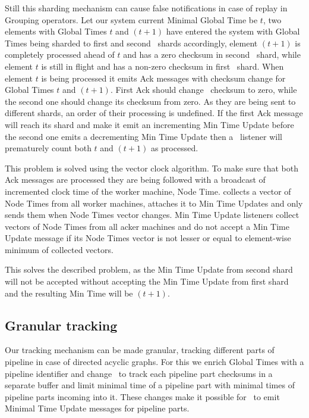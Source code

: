 Still this sharding mechanism can cause false notifications in case of replay in Grouping operators. Let our system current Minimal Global Time be $t$, two elements with Global Times $t$ and $(t+1)$ have entered the system with Global Times being sharded to first and second \tracker\ shards accordingly, element $(t+1)$ is completely processed ahead of $t$ and has a zero checksum in second \tracker\ shard, while element $t$ is still in flight and has a non-zero checksum in first \tracker\ shard. When element $t$ is being processed it emits Ack messages with checksum change for Global Times $t$ and $(t+1)$. First Ack should change \tracker\ checksum to zero, while the second one should change its checksum from zero. As they are being sent to different shards, an order of their processing is undefined. If the first Ack message will reach its shard and make it emit an incrementing Min Time Update before the second one emits a decrementing Min Time Update then a \tracker\ listener will prematurely count both $t$ and $(t+1)$ as processed.

This problem is solved using the vector clock algorithm. To make sure that both Ack messages are processed they are being followed with a broadcast of incremented clock time of the worker machine, Node Time. \tracker collects a vector of Node Times from all worker machines, attaches it to Min Time Updates and only sends them when Node Times vector changes. Min Time Update listeners collect vectors of Node Times from all acker machines and do not accept a Min Time Update message if its Node Times vector is not lesser or equal to element-wise minimum of collected vectors.

This solves the described problem, as the Min Time Update from second shard will not be accepted without accepting the Min Time Update from first shard and the resulting Min Time will be $(t+1)$.

\subsection{Granular tracking}

Our tracking mechanism can be made granular, tracking different parts of pipeline in case of directed acyclic graphs. For this we enrich Global Times with a pipeline identifier and change \tracker\ to track each pipeline part checksums in a separate buffer and limit minimal time of a pipeline part with minimal times of pipeline parts incoming into it. These changes make it possible for \tracker\ to emit Minimal Time Update messages for pipeline parts.

